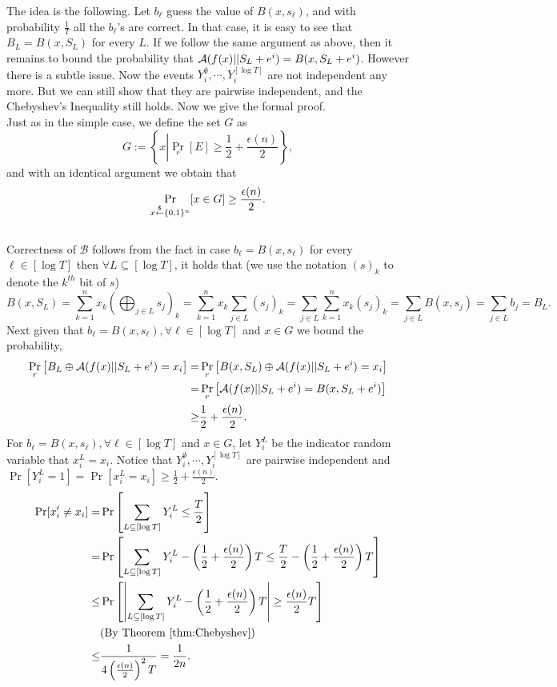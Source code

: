 \medskip
The idea is the following. Let $b_\ell$ guess the value of $B(x,s_\ell)$, and with probability $\frac{1}{T}$ all the $b_{\ell}$'s are correct. In that case, it is easy to see that $B_L = B(x, S_L)$ for every $L$. If we follow the same argument as above, then it remains to bound the probability that ${\mathcal A}(f(x) || S_L+e^i)=B(x, S_L + e^i)$. However there is a subtle issue. Now the events $Y_i^\emptyset, \cdots, Y_i^{[\log T]}$ are not independent any more. But we can still show that they are pairwise independent, and the Chebyshev's Inequality still holds. Now we give the formal proof. \\
Just as in the simple case, we define the set $G$ as
$$G := \left\{x \left| \Pr_r \left[ E \right]\geq \frac{1}{2} + \frac{\epsilon(n)}{2} \right. \right\},$$
and with an identical argument we obtain that
$$\Pr_{x \stackrel{\$}{\leftarrow} \{ 0, 1 \}^{n}}[x \in G] \geq \frac{\epsilon(n)}{2}.$$\\
Correctness of $\mathcal{B}$ follows from the fact in case $b_\ell = B(x,s_\ell)$ for every $\ell \in [\log T]$ then $\forall L \subseteq [\log T]$, it holds that (we use the notation $(s)_k$ to denote the $k^{th}$ bit of $s$)
$$B(x,S_L) = \sum_{k=1}^n x_k \left(\bigoplus_{j \in L} s_j\right)_k =  \sum_{k=1}^n x_k \sum_{j \in L} \left(s_j\right)_k = \sum_{j \in L} \sum_{k=1}^n x_k \left(s_j\right)_k = \sum_{j \in L}B(x,s_j) = \sum_{j\in L} b_j  = B_L.$$
Next given that $b_\ell = B(x,s_\ell), \forall \ell \in [\log T]$ and $x\in G$ we bound the probability,
\begin{align*}
\Pr_{r} \left[  B_L \oplus {\mathcal A}(f(x) || S_L+e^i) = x_i \right]
=& \Pr_{r} \left[ B(x,S_L) \oplus {\mathcal A}(f(x) || S_L+e^i) = x_i \right]\\
=& \Pr_{r} \left[ {\mathcal A}(f(x) || S_L+e^i) =  B(x,S_L +e^i) \right]\\
\geq& \frac{1}{2} + \frac{\epsilon(n)}{2}.
\end{align*}
For $b_\ell = B(x,s_\ell), \forall \ell \in [\log T]$ and $x\in G$, let $Y_i^L$ be the indicator random variable that $x_i^L = x_i$.
Notice that $Y_i^\emptyset, \cdots, Y_i^{[\log T]}$ are pairwise independent and $\Pr[Y_i^L=1] = \Pr[x_i^L = x_i] \geq \frac{1}{2} + \frac{\epsilon(n)}{2}$.
\begin{align*}
\Pr[x'_i \neq x_i] =& \Pr\left[\sum_{L \subseteq [\log T]} Y_i^L \leq \frac{T}{2} \right]\\
=& \Pr\left[\sum_{L \subseteq [\log T]} Y_i^L - \left(\frac{1}{2} +  \frac{\epsilon(n)}{2} \right)T \leq \frac{T}{2} - \left(\frac{1}{2} +  \frac{\epsilon(n)}{2} \right)T \right]\\
\leq& \Pr\left[ \left| \sum_{L \subseteq [\log T]} Y_i^L - \left(\frac{1}{2} +  \frac{\epsilon(n)}{2} \right)T \right| \geq \frac{\epsilon(n)}{2} T \right]\\
& \text{(By Theorem~\ref{thm:Chebyshev})}\\
\leq& \frac{1}{4\left( \frac{\epsilon(n)}{2}\right)^2T} = \frac{1}{2n}.
\end{align*}
